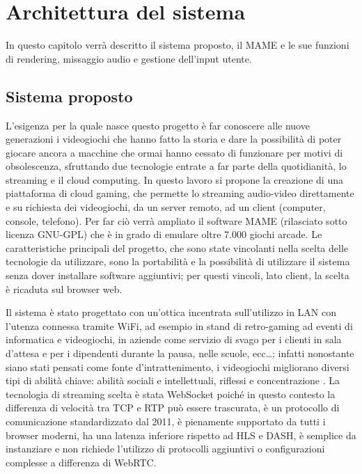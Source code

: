 %
%

\chapter{Architettura del sistema}
In questo capitolo verrà descritto il sistema proposto, il MAME e le sue funzioni di rendering, missaggio audio e gestione dell'input utente.




\section{Sistema proposto}
L'esigenza per la quale nasce questo progetto è far conoscere alle nuove generazioni i videogiochi che hanno fatto la storia e dare la possibilità di poter giocare ancora a macchine che ormai hanno cessato di funzionare per motivi di obsolescenza, sfruttando due tecnologie entrate a far parte della quotidianità, lo streaming e il cloud computing. In questo lavoro si propone la creazione di una piattaforma di cloud gaming, che permette lo streaming audio-video direttamente e su richiesta dei videogiochi, da un server remoto, ad un client (computer, console, telefono). Per far ciò verrà ampliato il software MAME (rilasciato sotto licenza GNU-GPL) che è in grado di emulare oltre 7.000 giochi arcade. Le caratteristiche principali del progetto, che sono state vincolanti nella scelta delle tecnologie da utilizzare, sono la portabilità e la possibilità di utilizzare il sistema senza dover installare software aggiuntivi; per questi vincoli, lato client, la scelta è ricaduta sul browser web.

Il sistema è stato progettato con un'ottica incentrata sull'utilizzo in LAN con l'utenza connessa tramite WiFi, ad esempio in stand di retro-gaming ad eventi di informatica e videogiochi, in aziende come servizio di svago per i clienti in sala d'attesa e per i dipendenti durante la pausa, nelle scuole, ecc\dots; infatti nonostante siano stati pensati come fonte d'intrattenimento, i videogiochi migliorano diversi tipi di abilità chiave: abilità sociali e intellettuali, riflessi e concentrazione \parencite{Use_of_Cloud_Gaming_in_Education}. La tecnologia di streaming scelta è stata WebSocket poiché in questo contesto la differenza di velocità tra TCP e RTP può essere trascurata, è un protocollo di comunicazione standardizzato dal 2011, è pienamente supportato da tutti i browser moderni, ha una latenza inferiore rispetto ad HLS e DASH, è semplice da instanziare e non richiede l'utilizzo di protocolli aggiuntivi o configurazioni complesse a differenza di WebRTC.

